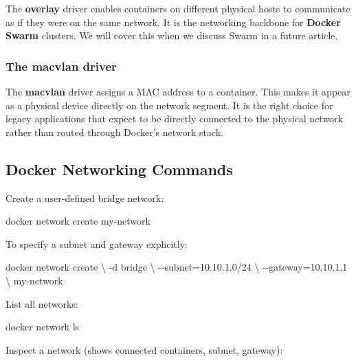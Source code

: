 \documentclass[11pt,american,a4paper,openany]{book}
\newenvironment{Shaded}{}{}
\newcommand{\NormalTok}[1]{#1}
\begin{document}
The \textbf{overlay} driver enables containers on different physical
hosts to communicate as if they were on the same network. It is the
networking backbone for \textbf{Docker Swarm} clusters. We will cover
this when we discuss Swarm in a future article.

\subsubsection{The macvlan driver}\label{the-macvlan-driver}

The \textbf{macvlan} driver assigns a MAC address to a container. This
makes it appear as a physical device directly on the network segment. It
is the right choice for legacy applications that expect to be directly
connected to the physical network rather than routed through Docker's
network stack.

\subsection{Docker Networking
Commands}\label{docker-networking-commands}

Create a user-defined bridge network:

\begin{Shaded}
\begin{Highlighting}[]
\NormalTok{docker network create my{-}network}
\end{Highlighting}
\end{Shaded}

To specify a subnet and gateway explicitly:

\begin{Shaded}
\begin{Highlighting}[]
\NormalTok{docker network create \textbackslash{}}
\NormalTok{  {-}d bridge \textbackslash{}}
\NormalTok{  {-}{-}subnet=10.10.1.0/24 \textbackslash{}}
\NormalTok{  {-}{-}gateway=10.10.1.1 \textbackslash{}}
\NormalTok{  my{-}network}
\end{Highlighting}
\end{Shaded}

List all networks:

\begin{Shaded}
\begin{Highlighting}[]
\NormalTok{docker network ls}
\end{Highlighting}
\end{Shaded}

Inspect a network (shows connected containers, subnet, gateway):
\end{document}
